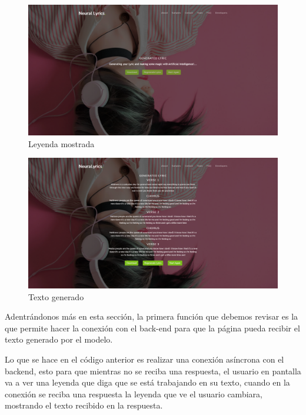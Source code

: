\documentclass[12pt, a4paper, titlepage]{report}
\begin{document}
\begin{figure}[H]
	\includegraphics[width=13.5cm]{./imagenes/Desarrollo/AplicacionWeb/Pleyenda.png}
	\centering 
	\caption{Leyenda mostrada}
\end{figure}
\begin{figure}[H]
	\includegraphics[width=13.5cm]{./imagenes/Desarrollo/AplicacionWeb/Ptexto.png}
	\centering 
	\caption{Texto generado}
\end{figure}
Adentrándonos más en esta sección, la primera función que debemos revisar es la que permite hacer la conexión con el back-end para que la página pueda recibir el texto generado por el modelo.
\begin{center}
	
\end{center}
Lo que se hace en el código anterior es realizar una conexión asíncrona con el backend, esto para que mientras no se reciba una respuesta, el usuario en pantalla va a ver una leyenda que diga que se está trabajando en su texto, cuando en la conexión se reciba una respuesta la leyenda que ve el usuario cambiara, mostrando el texto recibido en la respuesta.
\begin{center}
	
\end{center}
\end{document}
